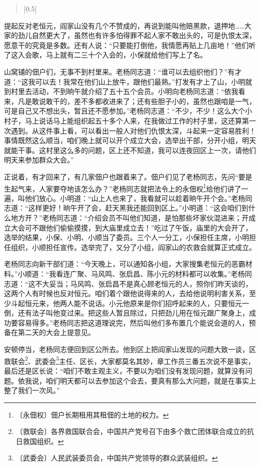 \documentclass[12pt,UTF-8,openany]{ctexbook}
\begin{document}
\begin{large}
\begin{verse}[0.5\linewidth]
    \end{verse}
    
    提起反对老恒元，阎家山没有几个不赞成的，再说到能叫他赔黑款，退押地……大家的劲儿自然更大了，虽然也有许多怕得罪不起人家不敢出头的，可是仇恨太深，愿意干的究竟是多数。还有人说：“只要能打倒他，我情愿再贴上几亩地！”他们听了这入会歌，马上就有二三十个入会的，小保就给他们写上了名。
    
    山窝铺的佃户们，无事不到村里来。老杨同志道：“谁可以去组织他们？”有才道：“这我可以去！我常在他们山上放牛，跟他们最熟。”打发有才上了山，小明就到村里去活动，不到晌午就介绍了五十五个会员。小明向老杨同志道：“依我看来，凡是敢说敢干的，差不多都收进来了；还有些胆子小的，虽然也跟咱是一气，可是自己又不想出头，暂且还不愿参加。”老杨同志道：“不少，不少！这么大个小村子，马上说话马上能组织起五十多个人来，在我做过工作的村子里，这还算第一次遇到。从这件事上看，可以看出一般人对他们仇恨太深，斗起来一定容易胜利！事情既然这么顺当，咱们晚上就可以开个成立大会，选举出干部，分开小组，明天就能干事。这村里这么多的问题，区上还不知道，我可以连夜回区上一次，请他们明天来参加群众大会。”
    
    正说着，有才回来了，有几家佃户也跟着来了。佃户们见了老杨同志，先问“要是生起气来，人家要夺地该怎么办？”老杨同志就把法令上的永佃权\footnote{〔永佃权〕佃户长期租用其租佃的土地的权力。}给他们讲了一遍，叫他们放心。小明道：“山上人也来了，我看就可以趁着晌午开个会。”老杨同志道：“这样更好！晌午开了会，赶天黑我还能回到区上。”小明道：“这会咱们到什么地方开？”老杨同志道：“介绍会员不叫他们知道，是怕那些坏家伙混进来；开成立大会可不跟他们偷偷摸摸，到大庙里成立去！”吃过了午饭，庙里的大会开了，选举的结果，小保、小明、小顺当了委员。三个人一分工，小保担任主席，小明担任组织，小顺担任宣传。选举完了，又分了小组，阎家山的农救会就算正式成立。
    
    老杨同志向新干部们道：“今天晚上，可以通知各小组，大家搜集老恒元的恶霸材料。”小顺道：“我看连广聚、马风鸣、张启昌、陈小元的材料都可以收集。”老杨同志道：“这不大妥当；马风鸣、张启昌不是真心顾老恒元的人，照你们昨天谈的，这两个人有时候也反对恒元。咱们着个跟他说得来的人，去给他说明利害关系，至少斗起恒元来，他两人能不说话。小元他原来是你们招呼起来的人，只要恒元一倒，还有法子叫他变过来。把这些人暂且除过，只把劲儿用在恒元跟广聚身上，成功要容易得多。”老杨同志把这道理说完，然后叫他们多布置几个能说会道的人，预备在第二天的大会上提意见。
    
    安顿停当，老杨同志便回到区公所去。他到区上把阎家山发现的问题大致一谈，区救联会\footnote{〔救联会〕各界救国联合会，中国共产党号召下由多个救亡团体联合成立的抗日救国组织。}、武委会\footnote{〔武委会〕人民武装委员会，中国共产党领导的群众武装组织。}主任、区长，大家都莫名其妙，章工作员三番五次说不是事实，最后还是区长说：“咱们不敢主观主义，不要以为咱们没有发现问题，就算没有问题。依我说，咱们明天都可以去参加这个会去，要真有那么大问题，就是在事实上整了我们一次风。”
    

\end{large}
\end{document}
